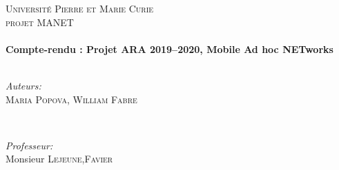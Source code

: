 \documentclass[11pt,a4paper,sans]{report}
\begin{document}
\begin{titlepage}



\center %


\textsc{\LARGE Université Pierre et Marie Curie}\\[1.5cm] %
\textsc{\Large projet MANET}\\[0.5cm] %

\vfill
\HRule \\[0.4cm]
{ \huge \bfseries Compte-rendu : Projet ARA 2019–2020, Mobile Ad hoc NETworks }\\[0.4cm] %
\HRule \\[1.5cm]
\vfill

\begin{minipage}{0.4\textwidth}
\begin{flushleft} \large
\emph{Auteurs:}\\
		\textsc{Maria Popova, William Fabre} 
		\end{flushleft}
		\end{minipage}
		~
		\begin{minipage}{0.4\textwidth}
		\begin{flushright} \large
		\emph{Professeur:} \\
			Monsieur \textsc{Lejeune},\textsc{Favier}
			\end{flushright}
			\end{minipage}\\[2cm]




\end{titlepage}
\end{document}
